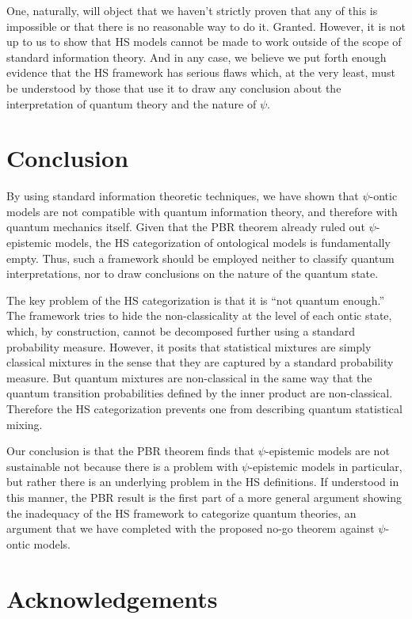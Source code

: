 \documentclass[10pt,twocolumn, nofootinbib]{revtex4-2}
\begin{document}
One, naturally, will object that we haven't strictly proven that any of this is impossible or that there is no reasonable way to do it. Granted. However, it is not up to us to show that HS models cannot be made to work outside of the scope of standard information theory. And in any case, we believe we put forth enough evidence that the HS framework has serious flaws which, at the very least, must be understood by those that use it to draw any conclusion about the interpretation of quantum theory and the nature of $\psi$. 

\section{Conclusion}

By using standard information theoretic techniques, we have shown that $\psi$-ontic models are not compatible with quantum information theory, and therefore with quantum mechanics itself. Given that the PBR theorem already ruled out $\psi$-epistemic models, the HS categorization of ontological models is fundamentally empty. Thus, such a framework should be employed neither to classify quantum interpretations, nor to draw conclusions on the nature of the quantum state.

The key problem of the HS categorization is that it is ``not quantum enough.'' The framework tries to hide the non-classicality at the level of each ontic state, which, by construction, cannot be decomposed further using a standard probability measure. However, it posits that statistical mixtures are simply classical mixtures in the sense that they are captured by a standard probability measure. But quantum mixtures are non-classical in the same way that the quantum transition probabilities defined by the inner product are non-classical. Therefore the HS categorization prevents one from describing quantum statistical mixing.

Our conclusion is that the PBR theorem finds that $\psi$-epistemic models are not sustainable not because there is a problem with $\psi$-epistemic models in particular, but rather there is an underlying problem in the HS definitions. If understood in this manner, the PBR result is the first part of a more general argument showing the inadequacy of the HS framework to categorize quantum theories, an argument that we have completed with the proposed no-go theorem against $\psi$-ontic models.

\section{Acknowledgements}
\end{document}
